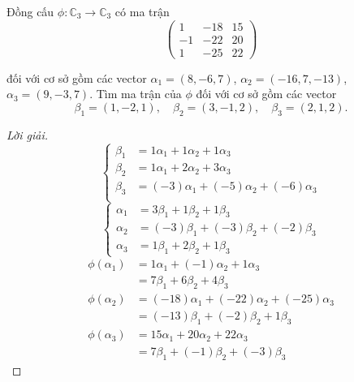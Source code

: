 \documentclass[class=nhvh-linear-algebra,crop=false]{standalone}
\begin{document}
\begin{exercise}
    Đồng cấu $\phi: \mathbb{C}_{3}\to\mathbb{C}_{3}$ có ma trận
    \[
        \begin{pmatrix}
            1  & -18 & 15 \\
            -1 & -22 & 20 \\
            1  & -25 & 22
        \end{pmatrix}
    \]
    \par đối với cơ sở gồm các vector $\alpha_{1} = (8, -6, 7)$, $\alpha_{2} = (-16, 7, -13)$, $\alpha_{3} = (9, -3, 7)$. Tìm ma trận của $\phi$ đối với cơ sở gồm các vector
    \[
        \beta_{1} = (1, -2, 1),\quad\beta_{2} = (3, -1, 2),\quad\beta_{3} = (2, 1, 2).
    \]
\end{exercise}

\begin{proof}[Lời giải]
    \[
        \begin{cases}
            \beta_{1} & = 1\alpha_{1} + 1\alpha_{2} + 1\alpha_{3}          \\
            \beta_{2} & = 1\alpha_{1} + 2\alpha_{2} + 3\alpha_{3}          \\
            \beta_{3} & = (-3)\alpha_{1} + (-5)\alpha_{2} + (-6)\alpha_{3} \\
        \end{cases}
    \]
    \[
        \begin{cases}
            \alpha_{1} & = 3\beta_{1} + 1\beta_{2} + 1\beta_{3}          \\
            \alpha_{2} & = (-3)\beta_{1} + (-3)\beta_{2} + (-2)\beta_{3} \\
            \alpha_{3} & = 1\beta_{1} + 2\beta_{2} + 1\beta_{3}
        \end{cases}
    \]
    \begin{align*}
        \phi(\alpha_{1}) & = 1\alpha_{1} + (-1)\alpha_{2} + 1\alpha_{3}          \\
                         & = 7\beta_{1} + 6\beta_{2} + 4\beta_{3}                \\
        \phi(\alpha_{2}) & = (-18)\alpha_{1} + (-22)\alpha_{2} + (-25)\alpha_{3} \\
                         & = (-13)\beta_{1} + (-2)\beta_{2} + 1\beta_{3}         \\
        \phi(\alpha_{3}) & = 15\alpha_{1} + 20\alpha_{2} + 22\alpha_{3}          \\
                         & = 7\beta_{1} + (-1)\beta_{2} + (-3)\beta_{3}
    \end{align*}

\end{proof}
\end{document}
